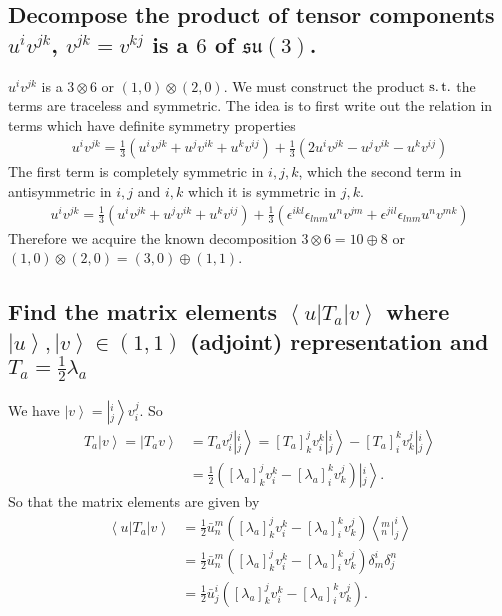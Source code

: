 \documentclass[main.tex]{subfiles}
\begin{document}
\subsection{Decompose the product of tensor components $u^iv^{jk}$, $v^{jk}=v^{kj}$ is a $6$ of $\mathfrak{su}(3)$.}
$u^iv^{jk}$ is a $3\otimes6$ or $(1,0)\otimes(2,0)$. We must construct the product $\operatorname{s.t.}$ the terms are traceless and symmetric. The idea is to first write out the relation in terms which have definite symmetry properties
\begin{align}
u^iv^{jk}=\frac{1}{3}(u^iv^{jk}+u^jv^{ik}+u^kv^{ij}) +\frac{1}{3}(2u^iv^{jk}-u^jv^{ik}-u^kv^{ij})
\end{align}
The first term is completely symmetric in $i,j,k$, which the second term in antisymmetric in $i,j$ and $i,k$ which it is symmetric in $j,k$.
\begin{align}
u^iv^{jk}=\frac{1}{3}(u^iv^{jk}+u^jv^{ik}+u^kv^{ij})+\frac{1}{3}(\epsilon^{ikl}\epsilon_{lnm}u^nv^{jm}+\epsilon^{jil}\epsilon_{lnm}u^nv^{mk})
\end{align}
Therefore we acquire the known decomposition $3\otimes6=10\oplus8$ or $(1,0)\otimes(2,0)=(3,0)\oplus(1,1)$.

\subsection{Find the matrix elements $\left<u|T_a|v\right>$ where $\left|u\right>,\left|v\right>\in(1,1)$ (adjoint) representation and $T_a=\frac{1}{2}\lambda_a$}
We have $\left|v\right>=\left|^i_j\right>v_i^j$.
So 
\begin{align}
T_a\left|v\right>=\left|T_av\right>&=T_av^j_i\left|^i_j\right>=[T_a]^j_kv^k_i\left|^i_j\right>-[T_a]^k_iv^j_k\left|^i_j\right>\\
&=\frac{1}{2}([\lambda_a]^j_kv^k_i-[\lambda_a]^k_iv^j_k)\left|^i_j\right>.
\end{align}
So that the matrix elements are given by
\begin{align}
\left<u|T_a|v\right>&=\frac{1}{2}\bar u^m_n([\lambda_a]^j_kv^k_i-[\lambda_a]^k_iv^j_k)\left<^m_n|^i_j\right>\\
&=\frac{1}{2}\bar u^m_n([\lambda_a]^j_kv^k_i-[\lambda_a]^k_iv^j_k)\delta^i_m\delta^n_j\\
&=\frac{1}{2}\bar u^i_j([\lambda_a]^j_kv^k_i-[\lambda_a]^k_iv^j_k).
\end{align}
\end{document}
